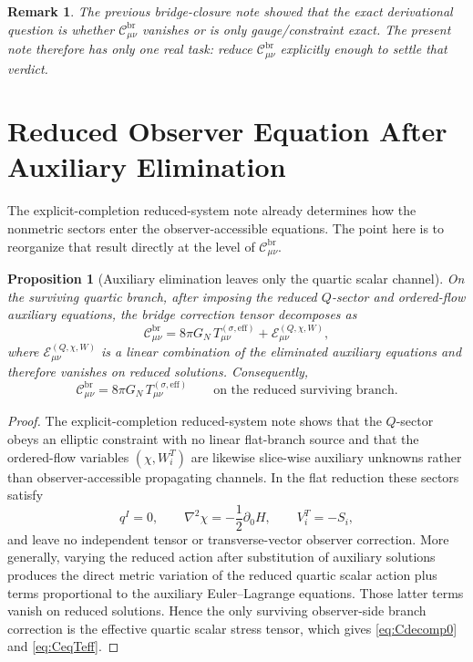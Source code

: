\documentclass[11pt]{article}
\newtheorem{proposition}{Proposition}
\newtheorem{remark}{Remark}
\begin{document}
\begin{remark}
The previous bridge-closure note showed that the exact derivational question is whether \(\mathcal C_{\mu\nu}^{\mathrm{br}}\) vanishes or is only gauge/constraint exact. The present note therefore has only one real task: reduce \(\mathcal C_{\mu\nu}^{\mathrm{br}}\) explicitly enough to settle that verdict.
\end{remark}

\section{Reduced Observer Equation After Auxiliary Elimination}

The explicit-completion reduced-system note already determines how the nonmetric sectors enter the observer-accessible equations. The point here is to reorganize that result directly at the level of \(\mathcal C_{\mu\nu}^{\mathrm{br}}\).

\begin{proposition}[Auxiliary elimination leaves only the quartic scalar channel]
\label{prop:auxelim}
On the surviving quartic branch, after imposing the reduced \(Q\)-sector and ordered-flow auxiliary equations, the bridge correction tensor decomposes as
\begin{equation}
\mathcal C_{\mu\nu}^{\mathrm{br}}
=
8\pi G_N\,T_{\mu\nu}^{(\sigma,\mathrm{eff})}
+ \mathcal E_{\mu\nu}^{(Q,\chi,W)},
\label{eq:Cdecomp0}
\end{equation}
where \(\mathcal E_{\mu\nu}^{(Q,\chi,W)}\) is a linear combination of the eliminated auxiliary equations and therefore vanishes on reduced solutions. Consequently,
\begin{equation}
\mathcal C_{\mu\nu}^{\mathrm{br}}
=
8\pi G_N\,T_{\mu\nu}^{(\sigma,\mathrm{eff})}
\qquad
\text{on the reduced surviving branch.}
\label{eq:CeqTeff}
\end{equation}
\end{proposition}

\begin{proof}
The explicit-completion reduced-system note shows that the \(Q\)-sector obeys an elliptic constraint with no linear flat-branch source and that the ordered-flow variables \((\chi,W_i^T)\) are likewise slice-wise auxiliary unknowns rather than observer-accessible propagating channels. In the flat reduction these sectors satisfy
\[
q^I=0,
\qquad
\nabla^2\chi=-\frac{1}{2}\partial_0H,
\qquad
V_i^T=-S_i,
\]
and leave no independent tensor or transverse-vector observer correction. More generally, varying the reduced action after substitution of auxiliary solutions produces the direct metric variation of the reduced quartic scalar action plus terms proportional to the auxiliary Euler--Lagrange equations. Those latter terms vanish on reduced solutions. Hence the only surviving observer-side branch correction is the effective quartic scalar stress tensor, which gives \eqref{eq:Cdecomp0} and \eqref{eq:CeqTeff}.
\end{proof}
\end{document}
